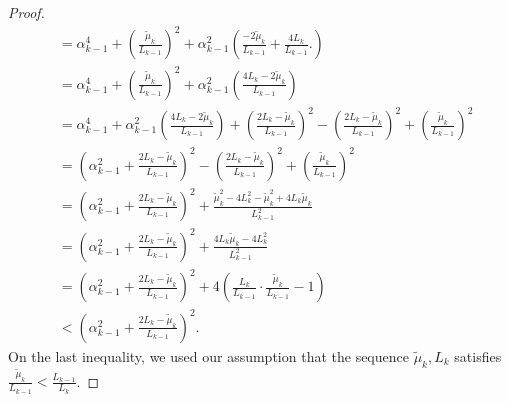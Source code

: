 \documentclass[12pt]{article}
\begin{document}
\begin{proof}
\begin{align*}
            &= \alpha_{k - 1}^4 + \left(\frac{\tilde \mu_k}{L_{k - 1}}\right)^2
            + \alpha_{k - 1}^2 \left(
                \frac{-2\tilde \mu_k}{L_{k - 1}} + \frac{4L_k}{L_{k - 1}}. 
            \right)
            \\
            &= \alpha_{k - 1}^4 + \left(\frac{\tilde \mu_k}{L_{k - 1}}\right)^2
            + \alpha_{k - 1}^2 \left(
                \frac{4L_k - 2\tilde \mu_k}{L_{k - 1}}
            \right)
            \\
            &= \alpha_{k - 1}^4
            + \alpha_{k - 1}^2 \left(
                \frac{4L_k - 2\tilde \mu_k}{L_{k - 1}}
            \right) 
            + \left(
                \frac{2L_k - \tilde \mu_k}{L_{k - 1}}
            \right)^2
            - \left(
                \frac{2L_k - \tilde \mu_k}{L_{k - 1}}
            \right)^2
            + \left(\frac{\tilde \mu_k}{L_{k - 1}}\right)^2
            \\
            &= \left(
                \alpha_{k - 1}^2 + 
                \frac{2L_k - \tilde \mu_k}{L_{k - 1}}
            \right)^2
            - \left(
                \frac{2L_k - \tilde \mu_k}{L_{k - 1}}
            \right)^2
            + \left(\frac{\tilde \mu_k}{L_{k - 1}}\right)^2
            \\
            &= 
            \left(
                \alpha_{k - 1}^2 + 
                \frac{2L_k - \tilde \mu_k}{L_{k - 1}}
            \right)^2
            + 
            \frac{
                \tilde \mu_k^2 - 4L_k^2 - \tilde \mu_k^2 + 4L_k\tilde \mu_k
            }{L_{k - 1}^2}
            \\
            &= 
            \left(
                \alpha_{k - 1}^2 + 
                \frac{2L_k - \tilde \mu_k}{L_{k - 1}}
            \right)^2
            + 
            \frac{
                4L_k \tilde \mu_k - 4L_k^2
            }{L_{k - 1}^2}
            \\
            &= 
            \left(
                \alpha_{k - 1}^2 + 
                \frac{2L_k - \tilde \mu_k}{L_{k - 1}}
            \right)^2
            + 
            4\left(
                \frac{L_k}{L_{k - 1}}\cdot \frac{\tilde \mu_k}{L_{k - 1}} - 1
            \right)
            \\
            &< 
            \left(
                \alpha_{k - 1}^2 + 
                \frac{2L_k - \tilde \mu_k}{L_{k - 1}}
            \right)^2. 
        \end{align*}
        On the last inequality, we used our assumption that the sequence $\tilde\mu_k, L_k$ satisfies $\frac{\tilde \mu_k}{L_{k - 1}} < \frac{L_{k - 1}}{L_k}$. 

\end{proof}
\end{document}
